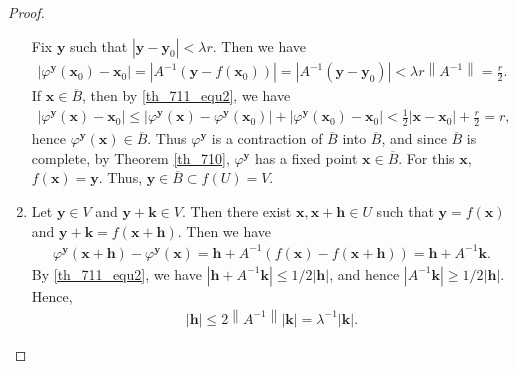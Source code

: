 \documentclass[11pt]{book}
\theoremstyle{definition}
\numberwithin{equation}{chapter}
\begin{document}
\begin{proof}
\begin{enumerate}[label=(\alph*)]
    Fix $\mathbf{y}$ such that $\left|\mathbf{y} - \mathbf{y}_0\right| < \lambda r$. Then we have
    \begin{align*}
        \left|\varphi^{\mathbf{y}}(\mathbf{x}_0) - \mathbf{x}_0\right| = \left|A^{-1}\left(\mathbf{y} - f(\mathbf{x}_0)\right)\right| = \left|A^{-1}\left(\mathbf{y} - \mathbf{y}_0\right)\right| < \lambda r \left\|A^{-1}\right\| = \frac{r}{2}.
    \end{align*}
    If $\mathbf{x} \in \overline{B}$, then by \eqref{th_711_equ2}, we have
    \begin{align*}
        \left|\varphi^{\mathbf{y}}(\mathbf{x}) - \mathbf{x}_0\right| \leq \left|\varphi^{\mathbf{y}}(\mathbf{x}) - \varphi^{\mathbf{y}}(\mathbf{x}_0)\right| + \left|\varphi^{\mathbf{y}}(\mathbf{x}_0) - \mathbf{x}_0\right| < \frac{1}{2} \left|\mathbf{x} - \mathbf{x}_0\right| + \frac{r}{2} = r,
    \end{align*}
    hence $\varphi^{\mathbf{y}}(\mathbf{x}) \in \overline{B}$. Thus $\varphi^{\mathbf{y}}$ is a contraction of $\overline{B}$ into $\overline{B}$, and since $\overline{B}$ is complete, by Theorem \ref{th_710}, $\varphi^{\mathbf{y}}$ has a fixed point $\mathbf{x} \in \overline{B}$. For this $\mathbf{x}$, $f(\mathbf{x}) = \mathbf{y}$. Thus, $\mathbf{y} \in \overline{B} \subset f(U) = V$. 
    
    \item Let $\mathbf{y} \in V$ and $\mathbf{y} + \mathbf{k} \in V$. Then there exist $\mathbf{x}, \mathbf{x} + \mathbf{h} \in U$ such that $\mathbf{y} = f(\mathbf{x})$ and $\mathbf{y} + \mathbf{k} = f(\mathbf{x} + \mathbf{h})$. Then we have
    \begin{align*}
        \varphi^{\mathbf{y}}(\mathbf{x} + \mathbf{h}) - \varphi^{\mathbf{y}}(\mathbf{x}) = \mathbf{h} + A^{-1} \left(f(\mathbf{x}) - f(\mathbf{x} + \mathbf{h})\right) = \mathbf{h} + A^{-1} \mathbf{k}.
    \end{align*}
    By \eqref{th_711_equ2}, we have $\left|\mathbf{h} + A^{-1} \mathbf{k}\right| \leq 1/2 \left|\mathbf{h}\right|$, and hence $\left|A^{-1} \mathbf{k}\right| \geq 1/2 \left|\mathbf{h}\right|$. Hence, 
    \begin{align}\label{th_711_equ3}
        \left|\mathbf{h}\right| \leq 2 \left\|A^{-1}\right\| \left|\mathbf{k}\right| = \lambda^{-1} \left|\mathbf{k}\right|.
    \end{align}
    

\end{enumerate}
\end{proof}
\end{document}
